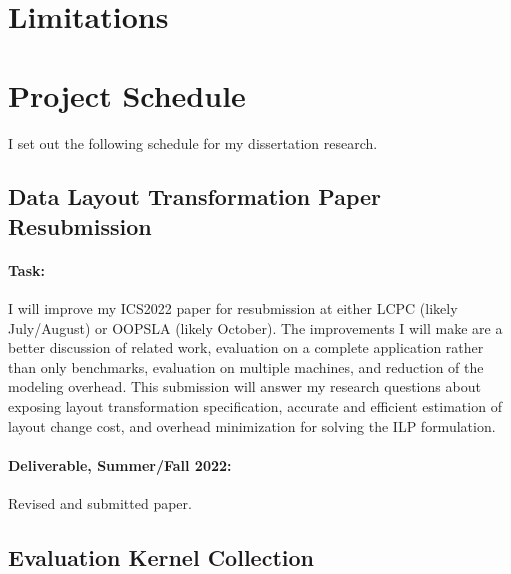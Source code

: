 \documentclass{article}
\begin{document}


\section{Limitations}




\section{Project Schedule}
I set out the following schedule for my dissertation research.

\subsection{Data Layout Transformation Paper Resubmission}

\paragraph{Task:} I will improve my ICS2022 paper for resubmission at either LCPC (likely July/August) or OOPSLA (likely October). 
The improvements I will make are a better discussion of related work, evaluation on a complete application rather than only benchmarks, evaluation on multiple machines, and reduction of the modeling overhead.
This submission will answer my research questions about exposing layout transformation specification, accurate and efficient estimation of layout change cost, and overhead minimization for solving the ILP formulation.

\paragraph{Deliverable, Summer/Fall 2022:} Revised and submitted paper.


\subsection{Evaluation Kernel Collection}
\end{document}
